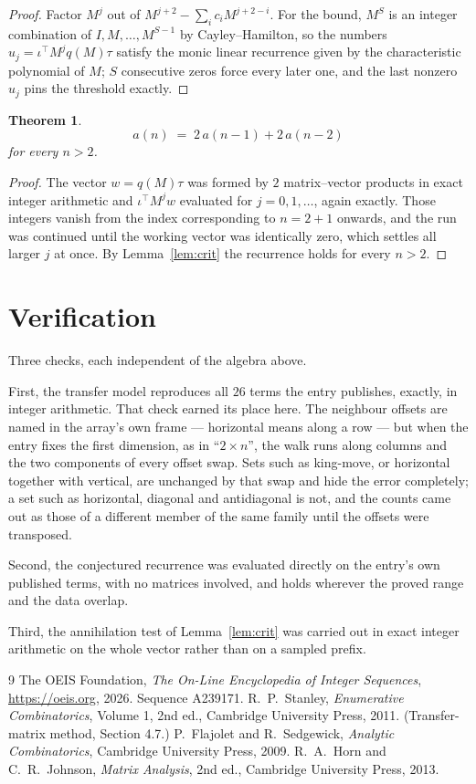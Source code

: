 \documentclass[11pt,a4paper]{article}
\theoremstyle{plain}
\newtheorem{theorem}{Theorem}
\theoremstyle{definition}
\begin{document}
\begin{proof}
Factor $M^{j}$ out of $M^{j+2}-\sum_ic_iM^{j+2-i}$. For the bound, $M^{S}$
is an integer combination of $I,M,\dots,M^{S-1}$ by Cayley--Hamilton, so the numbers
$u_j=\iota^{\!\top}M^{j}q(M)\tau$ satisfy the monic linear recurrence given by the
characteristic polynomial of $M$; $S$ consecutive zeros force every later one, and the last
nonzero $u_j$ pins the threshold exactly.
\end{proof}

\begin{theorem}
\[
a(n)\;=\;2\,a(n-1) + 2\,a(n-2)
\]
for every $n>2$.
\end{theorem}

\begin{proof}
The vector $w=q(M)\tau$ was formed by $2$ matrix--vector products in exact integer
arithmetic and $\iota^{\!\top}M^{j}w$ evaluated for $j=0,1,\dots$, again exactly. Those
integers vanish from the index corresponding to $n=2+1$ onwards, and the run was
continued until the working vector was identically zero, which settles all larger $j$ at once.
By Lemma~\ref{lem:crit} the recurrence holds for every $n>2$.
\end{proof}

\section{Verification}

Three checks, each independent of the algebra above.

First, the transfer model reproduces all $26$ terms the entry publishes, exactly, in
integer arithmetic. That check earned its place here. The neighbour offsets are named in the
array's own frame --- horizontal means along a row --- but when the entry fixes the first
dimension, as in ``$2\times n$'', the walk runs along columns and the two components of every
offset swap. Sets such as king-move, or horizontal together with vertical, are unchanged by
that swap and hide the error completely; a set such as horizontal, diagonal and antidiagonal
is not, and the counts came out as those of a different member of the same family until the
offsets were transposed.

Second, the conjectured recurrence was evaluated directly on the entry's own published terms,
with no matrices involved, and holds wherever the proved range and the data overlap.

Third, the annihilation test of Lemma~\ref{lem:crit} was carried out in exact integer
arithmetic on the whole vector rather than on a sampled prefix.

\begin{thebibliography}{9}
 The OEIS Foundation, \emph{The On-Line Encyclopedia of Integer
Sequences}, \url{https://oeis.org}, 2026. Sequence A239171.
 R.~P.~Stanley, \emph{Enumerative Combinatorics}, Volume 1, 2nd ed.,
Cambridge University Press, 2011. (Transfer-matrix method, Section 4.7.)
 P.~Flajolet and R.~Sedgewick, \emph{Analytic Combinatorics}, Cambridge
University Press, 2009.
 R.~A.~Horn and C.~R.~Johnson, \emph{Matrix Analysis}, 2nd ed., Cambridge
University Press, 2013.
\end{thebibliography}
\end{document}
